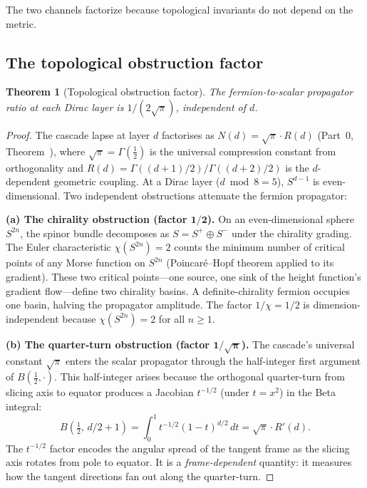\documentclass[12pt,a4paper]{article}
\newtheorem{theorem}{Theorem}[section]
\begin{document}
The two channels factorize because topological invariants do not depend on the metric.

\subsection{The topological obstruction factor}

\begin{theorem}[Topological obstruction factor]\label{thm:obstruction}
The fermion-to-scalar propagator ratio at each Dirac layer is $1/(2\sqrt{\pi})$, independent of $d$.
\end{theorem}

\begin{proof}
The cascade lapse at layer $d$ factorises as $N(d) = \sqrt{\pi}\cdot R(d)$
(Part~0, Theorem~), where $\sqrt{\pi} = \Gamma(\tfrac{1}{2})$ is the universal
compression constant from orthogonality and
$R(d) = \Gamma((d+1)/2)/\Gamma((d+2)/2)$ is the $d$-dependent geometric coupling.
At a Dirac layer ($d\bmod 8 = 5$), $S^{d-1}$ is even-dimensional.
Two independent obstructions attenuate the fermion propagator:

\medskip
\textbf{(a) The chirality obstruction (factor $\mathbf{1/2}$).}
On an even-dimensional sphere $S^{2n}$, the spinor bundle decomposes as
$S = S^+\oplus S^-$ under the chirality grading. The Euler characteristic
$\chi(S^{2n}) = 2$ counts the minimum number of critical points of any Morse
function on $S^{2n}$ (Poincar\'{e}--Hopf theorem applied to its gradient).
These two critical points---one source, one sink of the height function's
gradient flow---define two chirality basins. A definite-chirality fermion
occupies one basin, halving the propagator amplitude. The factor
$1/\chi = 1/2$ is dimension-independent because $\chi(S^{2n}) = 2$ for all
$n\geq 1$.

\medskip
\textbf{(b) The quarter-turn obstruction (factor $\mathbf{1/\sqrt{\pi}}$).}
The cascade's universal constant $\sqrt{\pi}$ enters the scalar propagator
through the half-integer first argument of $B(\tfrac{1}{2},\cdot)$. This
half-integer arises because the orthogonal quarter-turn from slicing axis to
equator produces a Jacobian $t^{-1/2}$ (under $t = x^2$) in the Beta integral:
\[
B(\tfrac{1}{2},\, d/2+1) = \int_0^1 t^{-1/2}(1-t)^{d/2}\,dt
= \sqrt{\pi}\cdot R'(d).
\]
The $t^{-1/2}$ factor encodes the angular spread of the tangent frame as the
slicing axis rotates from pole to equator. It is a \emph{frame-dependent}
quantity: it measures how the tangent directions fan out along the quarter-turn.


\end{proof}
\end{document}
